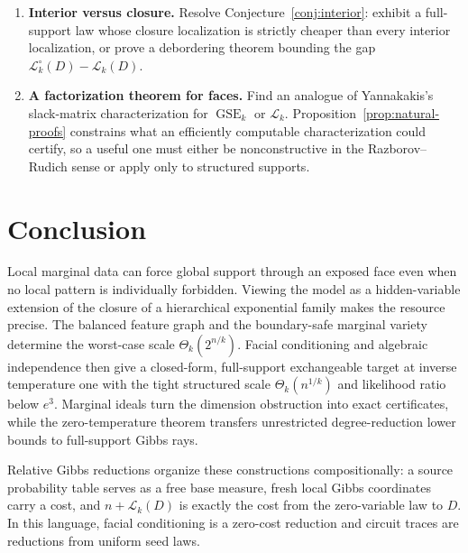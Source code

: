 \documentclass{article}
\newcommand{\LC}{\mathcal{L}}
\newcommand{\GSE}{\operatorname{GSE}}
\begin{document}
\begin{enumerate}
  worst-case and exchangeable scales.  Study coefficient-bounded variants
  and which algebraic certificates and circuit comparisons admit quantitative
  versions.  Proposition~\ref{prop:exchangeable-tv-collapse} shows that the
  analytic exchangeable family cannot supply such a fixed-error lower bound.
  Threshold discrepancy gives a transfer from Boolean correlation bounds;
  improving on separate slice estimates may require the shared polynomial
  dependence on the hidden assignment discussed in
  Section~\ref{sec:approximation}.
  \item \textbf{Interior versus closure.}  Resolve
  Conjecture~\ref{conj:interior}: exhibit a full-support law whose closure
  localization is strictly cheaper than every interior localization, or prove
  a debordering theorem bounding the gap
  $\LC_k^{\circ}(D)-\LC_k(D)$.
  \item \textbf{A factorization theorem for faces.}  Find an analogue of
  Yannakakis's slack-matrix characterization \cite{yannakakis91} for
  $\GSE_k$ or $\LC_k$.  Proposition~\ref{prop:natural-proofs} constrains what
  an efficiently computable characterization could certify, so a useful one
  must either be nonconstructive in the Razborov--Rudich sense or apply only
  to structured supports.
\end{enumerate}

\section{Conclusion}

Local marginal data can force global support through an exposed face even when
no local pattern is individually forbidden.  Viewing the model as a
hidden-variable extension of the closure of a hierarchical exponential family
makes the resource precise.  The balanced feature graph and the boundary-safe
marginal variety determine the worst-case scale
$\Theta_k(2^{n/k})$.  Facial conditioning and algebraic independence then give
a closed-form, full-support exchangeable target at inverse temperature one
with the tight structured scale $\Theta_k(n^{1/k})$ and likelihood ratio below
$e^3$.  Marginal ideals turn the dimension obstruction into exact
certificates, while the zero-temperature theorem transfers unrestricted
degree-reduction lower bounds to full-support Gibbs rays.

Relative Gibbs reductions organize these constructions compositionally: a
source probability table serves as a free base measure, fresh local Gibbs
coordinates carry a cost, and $n+\LC_k(D)$ is exactly the cost from the
zero-variable law to $D$.  In this language, facial conditioning is a
zero-cost reduction and circuit traces are reductions from uniform seed laws.
\end{document}
